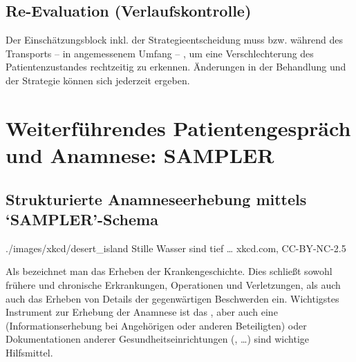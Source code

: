 \subsection{Re-Evaluation (Verlaufskontrolle)}


\noindent
Der Einschätzungsblock inkl. der Strategieentscheidung muss
 bzw.
während des Transports -- in
angemessenem Umfang -- , um eine
Verschlechterung des Patientenzustandes rechtzeitig zu erkennen. 
Änderungen in der Behandlung und der Strategie können sich
jederzeit ergeben.  %


\clearpage
\section{Weiterführendes Patientengespräch und Anamnese: SAMPLER}




\subsection{Strukturierte Anamneseerhebung mittels \enquote*{SAMPLER}-Schema}

{}
{}
{}
{./images/xkcd/desert_island}
{Stille Wasser sind tief \ldots}
{xkcd.com, CC-BY-NC-2.5}

\bigskip

\noindent Als  bezeichnet man das Erheben der
Krankengeschichte. Dies schließt sowohl frühere und
chronische Erkrankungen, Operationen und Verletzungen, als
auch auch das Erheben von Details der gegenwärtigen Beschwerden ein. 
Wichtigstes
Instrument zur Erhebung der Anamnese ist das
, aber auch eine 
(Informationserhebung bei Angehörigen oder anderen
Beteiligten) oder Dokumentationen anderer
Gesundheitseinrichtungen (, \ldots) sind
wichtige Hilfsmittel.




